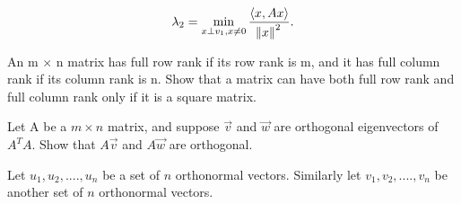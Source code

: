 \documentclass[solution,addpoints,12pt]{exam}
\newenvironment{Solution}{\begin{EnvFullwidth}\begin{solution}}{\end{solution}\end{EnvFullwidth}}
\begin{document}
\begin{questions}
\begin{parts}
\begin{equation}
        \lambda_2 = \min_{x \perp v_{1}, x \neq 0} \frac{\langle x, Ax \rangle}{\norm{x}^2}.
    \end{equation}

\end{parts}

\question An m $\times$  n matrix has full row rank if its row rank is m, and it has full column rank if its column rank is n. Show that a matrix can have both full row rank and full column rank only if it is a square matrix.
\begin{Solution}
\end{Solution}


\question Let A be a $m\times n$ matrix, and suppose $\vec{v}$ and $\vec{w}$ are orthogonal eigenvectors of $A^{T}A$. Show that $A\vec{v}$ and $A\vec{w}$ are orthogonal.
\begin{Solution}
\end{Solution}

\question Let $u_{1}, u_2, ...., u_n$ be a set of $n$ orthonormal vectors. Similarly let $v_{1}, v_2, ...., v_n$ be another set of $n$ orthonormal vectors.

\end{questions}
\end{document}

